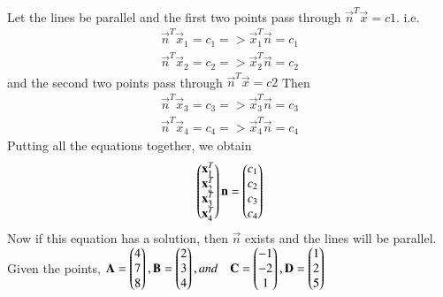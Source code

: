 Let the lines be parallel and the first two points pass through $\vec{n}^T\vec{x} = c1$. i.e.
\begin{align}
	\vec{n}^T\vec{x}_1=c_1 => \vec{x}_1^T\vec{n} = c_1 \\
	\vec{n}^T\vec{x}_2=c_2 => \vec{x}_2^T\vec{n} = c_2
\end{align}
and the second two points pass through $\vec{n}^T\vec{x} = c2$
Then
\begin{align}
	\vec{n}^T\vec{x}_3=c_3 => \vec{x}_3^T\vec{n} = c_3 \\
	\vec{n}^T\vec{x}_4=c_4 => \vec{x}_4^T\vec{n} = c_4
\end{align}
Putting all the equations together, we obtain
\begin{align}
	\begin{pmatrix}\mathbf{x}_1^T\\ \mathbf{x}_2^T\\ \mathbf{x}_3^T\\ \mathbf{x}_4^T\end{pmatrix}\mathbf{n} = \begin{pmatrix}c_1\\c_2\\c_3\\c_4\end{pmatrix}
\end{align}
Now if this equation has a solution, then $\vec{n}$ exists and the lines will be parallel.
Given the points, $\mathbf{A} = \begin{pmatrix} 4\\7\\	8\end{pmatrix}, 
\mathbf{B} = \begin{pmatrix} 2\\ 3\\ 4\end{pmatrix}, and \quad
\mathbf{C} = \begin{pmatrix} -1\\ -2\\ 1 \end{pmatrix}, 
\mathbf{D} = \begin{pmatrix} 1\\ 2\\ 5\end{pmatrix} $

